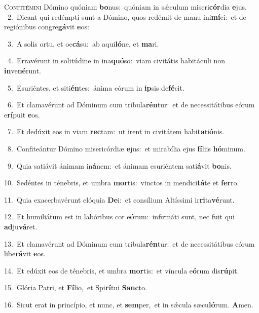 \lettrine{\initial\textcolor{\initialcolor}{C}}{onfitémini} Dómino quóniam \textbf{bo}\-nus:~\star quóniam in sǽculum miseri\-\textbf{cór}\-dia \textbf{e}\-jus.\\
{\numbfont\textcolor{\numbcolor}{~2.}}~Dicant qui redémpti sunt a Dómino, quos redémit de manu ini\-\textbf{mí}\-ci:~\star et de regiónibus congre\-\textbf{gá}\-vit \textbf{e}\-os:\par
{\numbfont\textcolor{\numbcolor}{~3.}}~A solis ortu, et oc\-\textbf{cá}\-su:~\star ab aqui\-\textbf{ló}\-ne, et \textbf{ma}\-ri.\par
{\numbfont\textcolor{\numbcolor}{~4.}}~Erravérunt in solitúdine in ina\-\textbf{quó}\-so:~\star viam civitátis habitáculi non \textbf{in}\-ve\-\textbf{né}\-runt.\par
{\numbfont\textcolor{\numbcolor}{~5.}}~Esuriéntes, et siti\-\textbf{én}\-tes:~\star ánima eórum in \textbf{ip}\-sis de\-\textbf{fé}\-cit.\par
{\numbfont\textcolor{\numbcolor}{~6.}}~Et clamavérunt ad Dóminum cum tribula\-\textbf{rén}\-tur:~\star et de necessitátibus eórum e\-\textbf{rí}\-puit \textbf{e}\-os.\par
{\numbfont\textcolor{\numbcolor}{~7.}}~Et dedúxit eos in viam \textbf{rec}\-tam:~\star ut irent in civitátem habi\-\textbf{ta}\-ti\-\textbf{ó}\-nis.\par
{\numbfont\textcolor{\numbcolor}{~8.}}~Confiteántur Dómino misericórdiæ \textbf{e}\-jus:~\star et mirabília ejus \textbf{fí}\-liis \textbf{hó}\-minum.\par
{\numbfont\textcolor{\numbcolor}{~9.}}~Quia satiávit ánimam in\-\textbf{á}\-nem:~\star et ánimam esuriéntem sati\-\textbf{á}\-vit \textbf{bo}\-nis.\par
{\numbfont\textcolor{\numbcolor}{10.}}~Sedéntes in ténebris, et umbra \textbf{mor}\-tis:~\star vinctos in mendici\-\textbf{tá}\-te et \textbf{fer}\-ro.\par
{\numbfont\textcolor{\numbcolor}{11.}}~Quia exacerbavérunt elóquia \textbf{De}\-i:~\star et consílium Altíssimi ir\-\textbf{ri}\-ta\-\textbf{vé}\-runt.\par
{\numbfont\textcolor{\numbcolor}{12.}}~Et humiliátum est in labóribus cor e\-\textbf{ó}\-rum:~\star infirmáti sunt, nec fuit qui \textbf{ad}\-ju\-\textbf{vá}\-ret.\par
{\numbfont\textcolor{\numbcolor}{13.}}~Et clamavérunt ad Dóminum cum tribula\-\textbf{rén}\-tur:~\star et de necessitátibus eórum libe\-\textbf{rá}\-vit \textbf{e}\-os.\par
{\numbfont\textcolor{\numbcolor}{14.}}~Et edúxit eos de ténebris, et umbra \textbf{mor}\-tis:~\star et víncula e\-\textbf{ó}\-rum dis\-\textbf{rú}\-pit.\par
{\numbfont\textcolor{\numbcolor}{15.}}~Glória Patri, et \textbf{Fí}\-lio,~\star et Spi\-\textbf{rí}\-tui \textbf{Sanc}\-to.\par
{\numbfont\textcolor{\numbcolor}{16.}}~Sicut erat in princípio, et nunc, et \textbf{sem}\-per,~\star et in sǽcula sæcu\-\textbf{ló}\-rum. \textbf{A}\-men.\par
